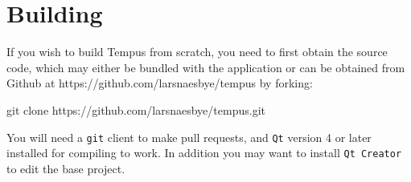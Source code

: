 \section{Building}

If you wish to build Tempus from scratch, you need to first obtain the source code, which may either be bundled with the application or can be obtained from Github at https://github.com/larsnaesbye/tempus by forking:

git clone https://github.com/larsnaesbye/tempus.git

You will need a \texttt{git} client to make pull requests, and \texttt{Qt} version 4 or later installed for compiling to work. In addition you may want to install \texttt{Qt Creator} to edit the base project.

